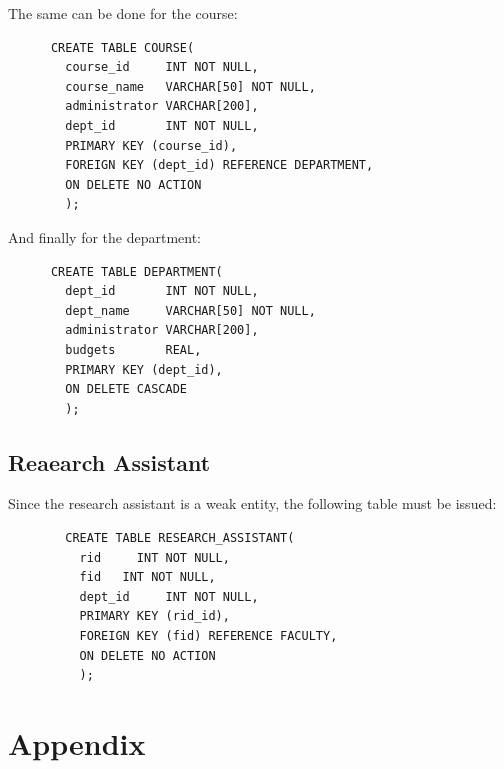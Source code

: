 \documentclass{article}
\begin{document}
    The same can be done for the course:

    \begin{lstlisting}
      CREATE TABLE COURSE(
        course_id     INT NOT NULL,
        course_name   VARCHAR[50] NOT NULL,
        administrator VARCHAR[200],
        dept_id       INT NOT NULL,
        PRIMARY KEY (course_id),
        FOREIGN KEY (dept_id) REFERENCE DEPARTMENT,
        ON DELETE NO ACTION
        );
    \end{lstlisting}

    And finally for the department:

    \begin{lstlisting}
      CREATE TABLE DEPARTMENT(
        dept_id       INT NOT NULL,
        dept_name     VARCHAR[50] NOT NULL,
        administrator VARCHAR[200],
        budgets       REAL,
        PRIMARY KEY (dept_id),
        ON DELETE CASCADE
        );
    \end{lstlisting}

    \subsection{Reaearch Assistant}
      Since the research assistant is a weak entity, the following table must be issued:

      \begin{lstlisting}
        CREATE TABLE RESEARCH_ASSISTANT(
          rid     INT NOT NULL,
          fid   INT NOT NULL,
          dept_id     INT NOT NULL,
          PRIMARY KEY (rid_id),
          FOREIGN KEY (fid) REFERENCE FACULTY,
          ON DELETE NO ACTION
          );
      \end{lstlisting}
  \newpage


  \section{Appendix}\label{sec:Appendix}

  \medskip

\end{document}
